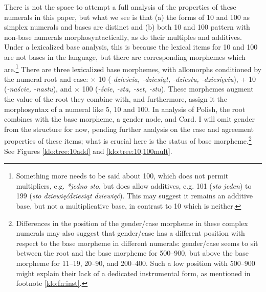 \documentclass[output=paper]{langscibook}
\begin{document}
\noindent There is not the space to attempt a full analysis of the properties of these numerals in this paper, but what we see is that (a) the forms of 10 and 100 as simplex numerals and bases are distinct and (b) both 10 and 100 pattern with non-base numerals morphosyntactically, as do their multiples and additives. Under a lexicalized base analysis, this is because the lexical items for 10 and 100 are not bases in the language, but there are corresponding morphemes which are.\footnote{Something more needs to be said about 100, which does not permit multipliers, e.g. \textit{*jedno sto}, but does allow additives, e.g. 101 (\textit{sto jeden}) to 199 (\textit{sto dziewięćdziesiąt dziewięć}). This may suggest it remains an additive base, but not a multiplicative base, in contrast to 10 which is neither.} There are three lexicalized base morphemes, with allomorphs conditioned by the numeral root and case: $\times$ 10 (\textit{-dzieścia, -dziesiąt, -dziestu, -dziesięciu}), + 10 (\textit{-naście, -nastu}), and $\times$ 100 (\textit{-ście, -sta, -set, -stu}). These morphemes augment the value of the root they combine with, and furthermore, assign it the morphosyntax of a numeral like 5, 10 and 100. In  analysis of Polish, the root combines with the base morpheme, a gender node, and Card. I will omit gender from the structure for now, pending further analysis on the case and agreement properties of these items; what is crucial here is the status of base morpheme.\footnote{Differences in the position of the gender/case morpheme in these complex numerals may also suggest that gender/case has a different position with respect to the base morpheme in different numerals: gender/case seems to sit between the root and the base morpheme for 500--900, but above the base morpheme for 11--19, 20--90, and 200--400. Such a low position with 500--900 might explain their lack of a dedicated instrumental form, as mentioned in footnote \ref{klo:fn:inst}.} See Figures \ref{klo:tree:10add} and \ref{klo:tree:10,100mult}.
\end{document}
